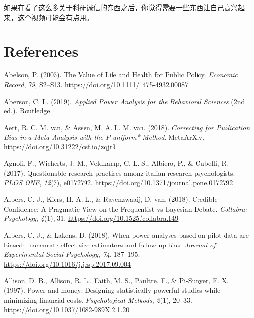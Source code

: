 \documentclass[
  letterpaper,
  DIV=11,
  numbers=noendperiod]{scrreprt}
\newlength{\cslhangindent}
\newlength{\cslentryspacingunit} %
\newenvironment{CSLReferences}[2] %
 {%
  \setlength{\parindent}{0pt}
  \ifodd #1
  \let\oldpar\par
  \def\par{\hangindent=\cslhangindent\oldpar}
  \fi
  \setlength{\parskip}{#2\cslentryspacingunit}
 }%
 {}
\begin{document}
如果在看了这么多关于科研诚信的东西之后，你觉得需要一些东西让自己高兴起来，\href{https://youtu.be/ZaNtz76dNSI}{这个视频}可能会有点用。


\hypertarget{references}{%
\chapter*{References}\label{references}}


\hypertarget{refs}{}
\begin{CSLReferences}{1}{0}
\leavevmode{}%
Abelson, P. (2003). The {Value} of {Life} and {Health} for {Public
Policy}. \emph{Economic Record}, \emph{79}, S2--S13.
\url{https://doi.org/10.1111/1475-4932.00087}

\leavevmode{}%
Aberson, C. L. (2019). \emph{Applied {Power Analysis} for the
{Behavioral Sciences}} (2nd ed.). {Routledge}.

\leavevmode{}%
Aert, R. C. M. van, \& Assen, M. A. L. M. van. (2018). \emph{Correcting
for {Publication Bias} in a {Meta-Analysis} with the {P-uniform}*
{Method}}. {MetaArXiv}. \url{https://doi.org/10.31222/osf.io/zqjr9}

\leavevmode{}%
Agnoli, F., Wicherts, J. M., Veldkamp, C. L. S., Albiero, P., \&
Cubelli, R. (2017). Questionable research practices among italian
research psychologists. \emph{PLOS ONE}, \emph{12}(3), e0172792.
\url{https://doi.org/10.1371/journal.pone.0172792}

\leavevmode{}%
Albers, C. J., Kiers, H. A. L., \& Ravenzwaaij, D. van. (2018). Credible
{Confidence}: {A Pragmatic View} on the {Frequentist} vs {Bayesian
Debate}. \emph{Collabra: Psychology}, \emph{4}(1), 31.
\url{https://doi.org/10.1525/collabra.149}

\leavevmode{}%
Albers, C. J., \& Lakens, D. (2018). When power analyses based on pilot
data are biased: {Inaccurate} effect size estimators and follow-up bias.
\emph{Journal of Experimental Social Psychology}, \emph{74}, 187--195.
\url{https://doi.org/10.1016/j.jesp.2017.09.004}

\leavevmode{}%
Allison, D. B., Allison, R. L., Faith, M. S., Paultre, F., \& Pi-Sunyer,
F. X. (1997). Power and money: {Designing} statistically powerful
studies while minimizing financial costs. \emph{Psychological Methods},
\emph{2}(1), 20--33. \url{https://doi.org/10.1037/1082-989X.2.1.20}


\end{CSLReferences}
\end{document}
